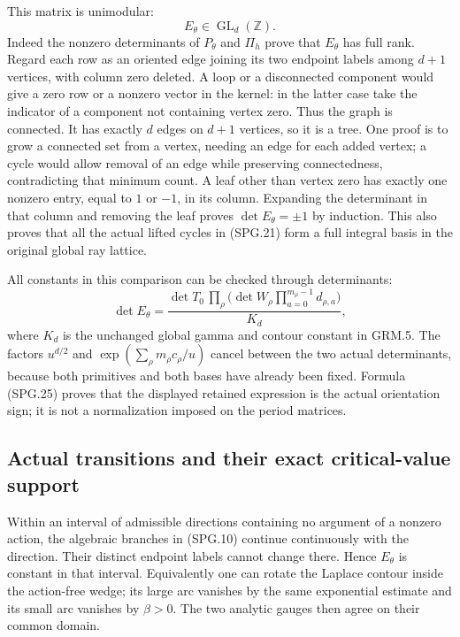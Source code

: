 This matrix is unimodular:
\[
                    E_\theta\in\operatorname{GL}_d(\mathbb Z).
 \tag{SPG.25}\label{GraphV2:eq:spg-unimodular}
\]
Indeed the nonzero determinants of \(P_\theta\) and \(\Pi_h\)
prove that \(E_\theta\) has full rank. Regard each row as an
oriented edge joining its two endpoint labels among \(d+1\)
vertices, with column zero deleted. A loop or a disconnected
component would give a zero row or a nonzero vector in the kernel:
in the latter case take the indicator of a component not containing
vertex zero. Thus the graph is connected. It has exactly \(d\)
edges on \(d+1\) vertices, so it is a tree. One proof is to grow
a connected set from a vertex, needing an edge for each added
vertex; a cycle would allow removal of an edge while preserving
connectedness, contradicting that minimum count. A leaf other than
vertex zero has exactly one nonzero entry, equal to \(1\) or
\(-1\), in its column. Expanding the determinant in that column
and removing the leaf proves \(\det E_\theta=\pm1\) by induction.
This also proves that all the actual lifted cycles in (SPG.21) form
a full integral basis in the original global ray lattice.

All constants in this comparison can be checked through determinants:
\[
 \det E_\theta
   =\frac{\det T_0\,
         \prod_\rho\bigl(\det W_\rho
                         \prod_{a=0}^{m_\rho-1}d_{\rho,a}\bigr)}{K_d},
 \tag{SPG.26}\label{GraphV2:eq:spg-det-constants}
\]
where \(K_d\) is the unchanged global gamma and contour constant
in GRM.5. The factors \(u^{d/2}\) and
\(\exp(\sum_\rho m_\rho c_\rho/u)\) cancel between the two
actual determinants, because both primitives and both bases have
already been fixed. Formula (SPG.25) proves that the displayed
retained expression is the actual orientation sign; it is not a
normalization imposed on the period matrices.

\subsection{Actual transitions and their exact critical-value support}

Within an interval of admissible directions containing no argument
of a nonzero action, the algebraic branches in (SPG.10) continue
continuously with the direction. Their distinct endpoint labels cannot
change there. Hence \(E_\theta\) is constant in that interval.
Equivalently one can rotate the Laplace contour inside the action-free
wedge; its large arc vanishes by the same exponential estimate and
its small arc vanishes by \(\beta>0\). The two analytic gauges
then agree on their common domain.

